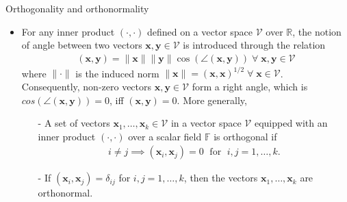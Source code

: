 \documentclass[t,usepdftitle=false]{beamer}
\begin{document}
\begin{frame}{Orthogonality and orthonormality}
\begin{itemize}
\item For any inner product $(\cdot,\cdot)$ defined on a vector space $\mathcal{V}$ over $\mathbb{R}$, the notion of angle between two vectors $\mathbf{x},\mathbf{y}\in\mathcal{V}$ is introduced through the relation
\begin{align*}
(\mathbf{x},\mathbf{y})=\|\mathbf{x}\|\|\mathbf{y}\|\cos(\angle(\mathbf{x},\mathbf{y}))\;\forall\;\mathbf{x},\mathbf{y}\in\mathcal{V}
\end{align*}
where $\|\cdot\|$ is the induced norm $\|\mathbf{x}\|=(\mathbf{x},\mathbf{x})^{1/2}\;\forall\;\mathbf{x}\in\mathcal{V}$.\smallskip\\
Consequently, non-zero vectors $\mathbf{x},\mathbf{y}\in\mathcal{V}$ form a right angle, which is $cos(\angle(\mathbf{x},\mathbf{y}))=0$, iff $(\mathbf{x},\mathbf{y})=0$. 
More generally, 
\begin{definition}
\begin{itemize}
\item[-] A set of vectors $\mathbf{x}_1,\dots,\mathbf{x}_k\in\mathcal{V}$ in a vector space $\mathcal{V}$ equipped with an inner product $(\cdot,\cdot)$ over a scalar field $\mathbb{F}$ is orthogonal if\vspace{0cm}
\begin{align*}
 i\neq j\implies(\mathbf{x}_i,\mathbf{x}_j)=0\;\text{ for }\;i,j=1,\dots,k.
\end{align*}
\item[-] If $(\mathbf{x}_i,\mathbf{x}_j)=\delta_{ij}$ for $i,j=1,\dots,k$, then the vectors $\mathbf{x}_1,\dots,\mathbf{x}_k$ are orthonormal.
\end{itemize}
\end{definition} 
\end{itemize}
\end{frame}
\end{document}
